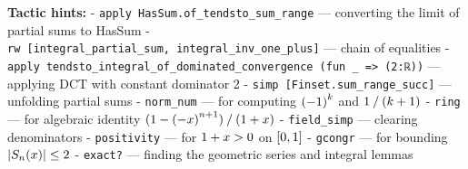 \documentclass[
]{article}
\begin{document}
\textbf{Tactic hints:} - \texttt{apply\ HasSum.of\_tendsto\_sum\_range}
--- converting the limit of partial sums to HasSum -
\texttt{rw\ {[}integral\_partial\_sum,\ integral\_inv\_one\_plus{]}} ---
chain of equalities -
\texttt{apply\ tendsto\_integral\_of\_dominated\_convergence\ (fun\ \_\ =\textgreater{}\ (2:ℝ))}
--- applying DCT with constant dominator 2 -
\texttt{simp\ {[}Finset.sum\_range\_succ{]}} --- unfolding partial sums
- \texttt{norm\_num} --- for computing
\(\mathopen{(}-{1}\mathclose{)}^{k}\)
and
\({1}\mathbin{/}\mathopen{(}k+{1}\mathclose{)}\)
- \texttt{ring} --- for algebraic identity
\(\mathopen{(}{1}-\mathopen{(}-x\mathclose{)}^{n+{1}}\mathclose{)}\mathbin{/}\mathopen{(}{1}+x\mathclose{)}\)
- \texttt{field\_simp} --- clearing denominators - \texttt{positivity}
--- for \({1}+x > {0}\) on
\(\mathopen{[}{0},{1}\mathclose{]}\)
- \texttt{gcongr} --- for bounding
\(\mathopen{\mDelimiter{|}}S_{n}\mathopen{\mDelimiter{(}}x\mathclose{\mDelimiter{)}}\mathclose{\mDelimiter{|}} \le {\mNumber{2}}\)
- \texttt{exact?} --- finding the geometric series and integral lemmas
\end{document}
